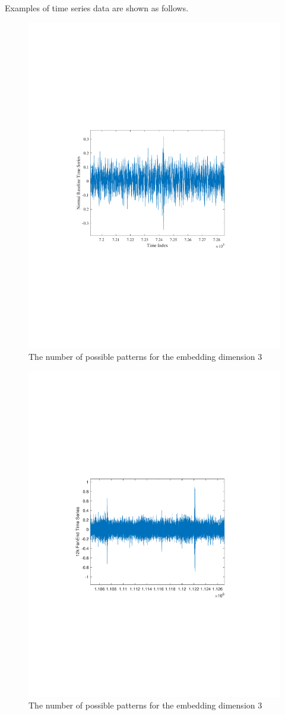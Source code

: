 \documentclass[sn-basic,pdflatex]{sn-jnl}
\theoremstyle{remark}
\theoremstyle{definition}
\begin{document}
Examples of time series data are shown as follows.

\begin{figure}
\includegraphics[width=0.5\linewidth,]{./normalbaselinetimeSeriesDE} \caption{The number of possible patterns for the embedding dimension 3}\label{fig:unnamed-chunk-1}
\end{figure}

\begin{figure}
\includegraphics[width=0.5\linewidth,]{./fanend12kDE} \caption{The number of possible patterns for the embedding dimension 3}\label{fig:unnamed-chunk-2}
\end{figure}
\end{document}
